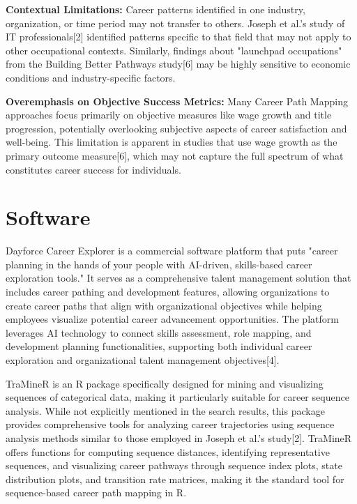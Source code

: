 \documentclass{article}
\begin{document}
\textbf{Contextual Limitations:} Career patterns identified in one industry, organization, or time period may not transfer to others. Joseph et al.'s study of IT professionals[2] identified patterns specific to that field that may not apply to other occupational contexts. Similarly, findings about "launchpad occupations" from the Building Better Pathways study[6] may be highly sensitive to economic conditions and industry-specific factors.

\textbf{Overemphasis on Objective Success Metrics:} Many Career Path Mapping approaches focus primarily on objective measures like wage growth and title progression, potentially overlooking subjective aspects of career satisfaction and well-being. This limitation is apparent in studies that use wage growth as the primary outcome measure[6], which may not capture the full spectrum of what constitutes career success for individuals.

\section{Software}

Dayforce Career Explorer is a commercial software platform that puts "career planning in the hands of your people with AI-driven, skills-based career exploration tools." It serves as a comprehensive talent management solution that includes career pathing and development features, allowing organizations to create career paths that align with organizational objectives while helping employees visualize potential career advancement opportunities. The platform leverages AI technology to connect skills assessment, role mapping, and development planning functionalities, supporting both individual career exploration and organizational talent management objectives[4].

TraMineR is an R package specifically designed for mining and visualizing sequences of categorical data, making it particularly suitable for career sequence analysis. While not explicitly mentioned in the search results, this package provides comprehensive tools for analyzing career trajectories using sequence analysis methods similar to those employed in Joseph et al.'s study[2]. TraMineR offers functions for computing sequence distances, identifying representative sequences, and visualizing career pathways through sequence index plots, state distribution plots, and transition rate matrices, making it the standard tool for sequence-based career path mapping in R.
\end{document}
